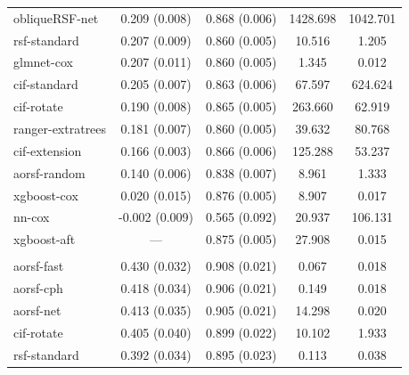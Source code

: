 \documentclass[twoside,11pt]{article}\usepackage[]{graphicx}\usepackage[]{xcolor}
\newenvironment{knitrout}{}{} %
\begin{document}
\begin{knitrout}
\begin{longtable}[t]{lcccc}
\hspace{1em}obliqueRSF-net & 0.209 (0.008) & 0.868 (0.006) & 1428.698 & 1042.701\\
\hspace{1em}rsf-standard & 0.207 (0.009) & 0.860 (0.005) & 10.516 & 1.205\\
\hspace{1em}glmnet-cox & 0.207 (0.011) & 0.860 (0.005) & 1.345 & 0.012\\
\hspace{1em}cif-standard & 0.205 (0.007) & 0.863 (0.006) & 67.597 & 624.624\\
\hspace{1em}cif-rotate & 0.190 (0.008) & 0.865 (0.005) & 263.660 & 62.919\\
\hspace{1em}ranger-extratrees & 0.181 (0.007) & 0.860 (0.005) & 39.632 & 80.768\\
\hspace{1em}cif-extension & 0.166 (0.003) & 0.866 (0.006) & 125.288 & 53.237\\
\hspace{1em}aorsf-random & 0.140 (0.006) & 0.838 (0.007) & 8.961 & 1.333\\
\hspace{1em}xgboost-cox & 0.020 (0.015) & 0.876 (0.005) & 8.907 & 0.017\\
\hspace{1em}nn-cox & -0.002 (0.009) & 0.565 (0.092) & 20.937 & 106.131\\
\hspace{1em}xgboost-aft & --- & 0.875 (0.005) & 27.908 & 0.015\\
\addlinespace[0.3em]
\multicolumn{5}{l}{\textit{\textbf{Primary biliary cholangitis; death, n = 276, p = 19}}}\\
\hline
\hspace{1em}aorsf-fast & 0.430 (0.032) & 0.908 (0.021) & 0.067 & 0.018\\
\hspace{1em}aorsf-cph & 0.418 (0.034) & 0.906 (0.021) & 0.149 & 0.018\\
\hspace{1em}aorsf-net & 0.413 (0.035) & 0.905 (0.021) & 14.298 & 0.020\\
\hspace{1em}cif-rotate & 0.405 (0.040) & 0.899 (0.022) & 10.102 & 1.933\\
\hspace{1em}rsf-standard & 0.392 (0.034) & 0.895 (0.023) & 0.113 & 0.038\\

\end{longtable}
\end{knitrout}
\end{document}
